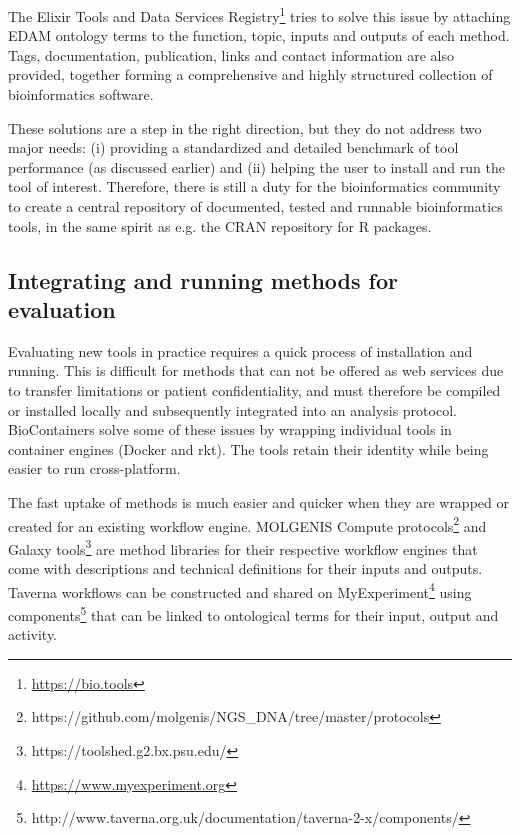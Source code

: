 The Elixir Tools and Data Services Registry\cite{Ison_2015}\footnote{\url{https://bio.tools}} tries to solve this issue by attaching EDAM\cite{Ison_2013} ontology terms to the function, topic, inputs and outputs of each method.
Tags, documentation, publication, links and contact information are also provided, together forming a comprehensive and highly structured collection of bioinformatics software.

These solutions are a step in the right direction, but they do not address two major needs: (i) providing a standardized and detailed benchmark of tool performance (as discussed earlier) and (ii) helping the user to install and run the tool of interest.
Therefore, there is still a duty for the bioinformatics community to create a central repository of documented, tested and runnable bioinformatics tools, in the same spirit as e.g. the CRAN repository for R packages.

\subsection{Integrating and running methods for evaluation} \label{methodsection_running}

Evaluating new tools in practice requires a quick process of installation and running.
This is difficult for methods that can not be offered as web services due to transfer limitations or patient confidentiality, and must therefore be compiled or installed locally and subsequently integrated into an analysis protocol.
BioContainers\cite{da_Veiga_Leprevost_2017} solve some of these issues by wrapping individual tools in container engines (Docker and rkt).
The tools retain their identity while being easier to run cross-platform.

The fast uptake of methods is much easier and quicker when they are wrapped or created for an existing workflow engine.
MOLGENIS Compute protocols\footnote{https://github.com/molgenis/NGS\_DNA/tree/master/protocols} and Galaxy tools\footnote{https://toolshed.g2.bx.psu.edu/} are method libraries for their respective workflow engines that come with descriptions and technical definitions for their inputs and outputs.
Taverna\cite{Wolstencroft_2013} workflows can be constructed and shared on My\-Ex\-pe\-ri\-ment\cite{Goble_2010}\footnote{\url{https://www.myexperiment.org}} using components\footnote{http://www.taverna.org.uk/documentation/taverna-2-x/components/} that can be linked to ontological terms for their input, output and activity.

